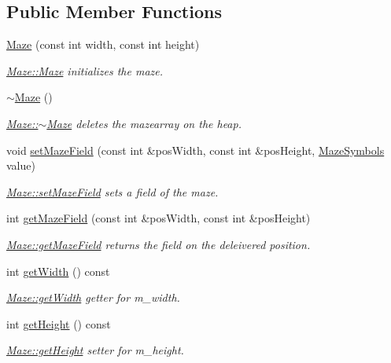 \subsection*{Public Member Functions}
\begin{DoxyCompactItemize}
\item 
\hyperlink{class_maze_a1caad1867d6d3fa28fd3886272b2f618}{Maze} (const int width, const int height)
\begin{DoxyCompactList}\small\item\em \hyperlink{class_maze_a1caad1867d6d3fa28fd3886272b2f618}{Maze\-::\-Maze} initializes the maze. \end{DoxyCompactList}\item 
\hyperlink{class_maze_a4f187353f595193318ac66133a22287e}{$\sim$\-Maze} ()
\begin{DoxyCompactList}\small\item\em \hyperlink{class_maze_a4f187353f595193318ac66133a22287e}{Maze\-::$\sim$\-Maze} deletes the mazearray on the heap. \end{DoxyCompactList}\item 
void \hyperlink{class_maze_a2d05ee06d2d4b6b9abe001e77a256c70}{set\-Maze\-Field} (const int \&pos\-Width, const int \&pos\-Height, \hyperlink{class_maze_a7a19b706242876f2c597033b3374e7fa}{Maze\-Symbols} value)
\begin{DoxyCompactList}\small\item\em \hyperlink{class_maze_a2d05ee06d2d4b6b9abe001e77a256c70}{Maze\-::set\-Maze\-Field} sets a field of the maze. \end{DoxyCompactList}\item 
int \hyperlink{class_maze_ac0fa84d55a0bf27854b1f8a7f0d7cebc}{get\-Maze\-Field} (const int \&pos\-Width, const int \&pos\-Height)
\begin{DoxyCompactList}\small\item\em \hyperlink{class_maze_ac0fa84d55a0bf27854b1f8a7f0d7cebc}{Maze\-::get\-Maze\-Field} returns the field on the deleivered position. \end{DoxyCompactList}\item 
int \hyperlink{class_maze_a55deabec3636694a2658ff902fe83a9b}{get\-Width} () const 
\begin{DoxyCompactList}\small\item\em \hyperlink{class_maze_a55deabec3636694a2658ff902fe83a9b}{Maze\-::get\-Width} getter for m\-\_\-width. \end{DoxyCompactList}\item 
int \hyperlink{class_maze_a3cfe8e5f193ff2ed9d6915c8841d376a}{get\-Height} () const 
\begin{DoxyCompactList}\small\item\em \hyperlink{class_maze_a3cfe8e5f193ff2ed9d6915c8841d376a}{Maze\-::get\-Height} setter for m\-\_\-height. \end{DoxyCompactList}\end{DoxyCompactItemize}



